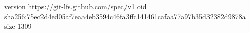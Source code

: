 version https://git-lfs.github.com/spec/v1
oid sha256:75ec2d4ed05af7eaa4eb3594c46fa3ffc141461cafaa77a97b35d32382d9878a
size 1309
